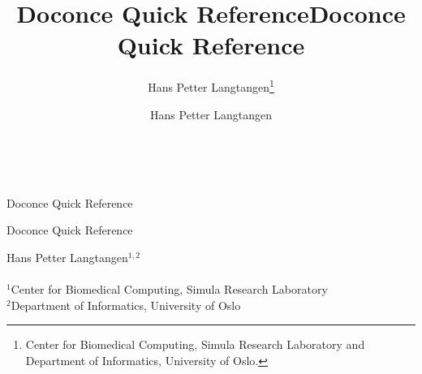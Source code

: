 \documentclass[%
oneside,                 %
final,                   %
10pt]{article}
\begin{document}






\title{Doconce Quick Reference}


\thispagestyle{empty}
\hbox{\ \ }
\vfill
\begin{center}
{\huge{\bfseries{
\begin{spacing}{1.25}
Doconce Quick Reference
\end{spacing}
}}}


\title*{Doconce Quick Reference}


\begin{center}
{\LARGE\bf
\begin{spacing}{1.25}
Doconce Quick Reference
\end{spacing}
}
\end{center}


\author{Hans Petter Langtangen\footnote{Center for Biomedical Computing, Simula Research Laboratory and Department of Informatics, University of Oslo.}}

\vspace{1.3cm}

    {\Large\textsf{Hans Petter Langtangen${}^{1, 2}$}}\\ [3mm]
    
\ \\ [2mm]

{\large\textsf{${}^1$Center for Biomedical Computing, Simula Research Laboratory} \\ [1.5mm]}
{\large\textsf{${}^2$Department of Informatics, University of Oslo} \\ [1.5mm]}

\author{Hans Petter Langtangen}


\end{center}
\end{document}
